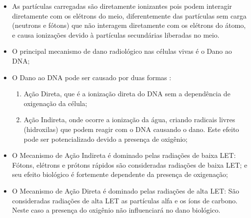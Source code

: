 \documentclass[11pt,a4paper]{article}
\begin{document}
            \begin{itemize}
                \item As partículas carregadas são diretamente ionizantes pois podem interagir diretamente com os elétrons do meio, diferentemente das partículas sem carga (neutrons e fótons) que não interagem diretamente com os elétrons do átomo, e causa ionizações devido à partículas secundárias liberadas no meio. 
                
                \item O principal mecanismo de dano radiológico nas células vivas é o Dano ao DNA;
                
                \item O Dano ao DNA pode ser causado por duas formas :
                
                    \begin{enumerate}
                        \item Ação Direta, que é a ionização direta do DNA sem a dependência de oxigenação da célula;
                        \item Ação Indireta, onde ocorre a ionização da água, criando radicais livres (hidroxilas) que podem reagir com o DNA causando o dano. Este efeito pode ser potencializado devido a presença de oxigênio;
                    \end{enumerate}
                
                \item O Mecanismo de Ação Indireta é dominado pelas radiações de baixa LET: Fótons, elétrons e prótons rápidos são consideradas radiações de baixa LET; e seu efeito biológico é fortemente dependente da presença de oxigenação;
                
                \item O Mecanismo de Ação Direta é dominado pelas radiações de alta LET: São consideradas radiações de alta LET as partículas alfa e os íons de carbono. Neste caso a presença do oxigênio não influenciará no dano biológico. 
            \end{itemize}
            


        

\end{document}
